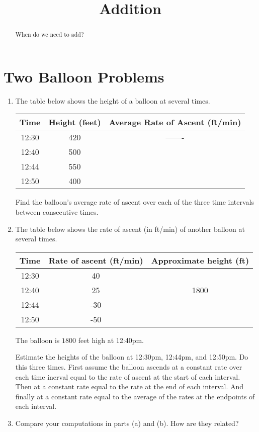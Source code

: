 \documentclass{ximera}
\title{Addition}
\begin{document}
\begin{abstract}
When do we need to add?
\end{abstract}
\maketitle


\section{Two Balloon Problems}

\begin{exercise} \label{EX:JERVER3ef}
\begin{enumerate}

\item The table below shows the height of a balloon at several times.

\begin{tabular}{|c|c|c|}
\hline
Time & Height (feet) & Average Rate of Ascent (ft/min) \\
\hline
12:30 & 420 & ------- \\ \hline
12:40 & 500 & \\ \hline
12:44 & 550 & \\ \hline
12:50 & 400 & \\
\hline
\end{tabular}


Find the balloon's average rate of ascent over each of the three time intervals between consecutive times.

\item The table below shows the rate of ascent (in ft/min) of another balloon at several times.

\begin{tabular}{|c|c|c|}
\hline
Time & Rate of ascent (ft/min) & Approximate height (ft) \\
\hline
12:30 & 40 &  \\ \hline
12:40 & 25 & 1800\\ \hline
12:44 & -30 & \\ \hline
12:50 & -50 & \\
\hline
\end{tabular}

The balloon is $1800$ feet high at 12:40pm.

Estimate the heights of the balloon at 12:30pm, 12:44pm, and 12:50pm. Do this three times. First assume the balloon ascends at a constant rate over each time inerval equal to the rate of ascent at the start of each interval. Then at a constant rate equal to the rate at the end of each interval. And finally at a constant rate equal to the average of the rates at the endpoints of each interval.

\item Compare your computations in parts (a) and (b). How are they related?


\end{enumerate}

\end{exercise}
\end{document}
